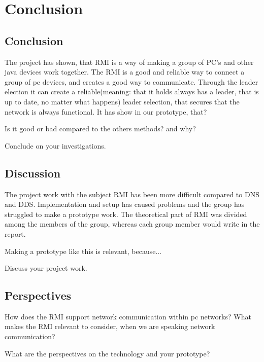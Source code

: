\chapter{Conclusion}
\section{Conclusion}

The project has shown, that RMI is a way of making a group of PC's and other java devices work together. 
The RMI is a good and reliable way to connect a group of pc devices, and creates a good way to communicate. Through the leader election it can create a reliable(meaning: that it holds always has a leader, that is up to date, no matter what happens) leader selection, that secures that the network is always functional.
It has show in our prototype, that?

Is it good or bad compared to the others methods? and why?

Conclude on your investigations.
\section{Discussion}
The project work with the subject RMI has been more difficult compared to DNS and DDS.
Implementation and setup has caused problems and the group has struggled to make a prototype work.
The theoretical part of RMI was divided among the members of the group, whereas each group member would write in the report.

Making a prototype like this is relevant, because...

Discuss your project work.

\section{Perspectives}
How does the RMI support network communication within pc networks?
What makes the RMI relevant to consider, when we are speaking network communication?

What are the perspectives on the technology and your prototype? 